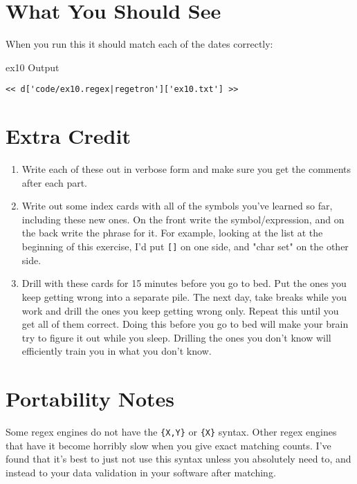 \section{What You Should See}

When you run this it should match each of the dates correctly:

\begin{code}{ex10 Output}
\begin{Verbatim}
<< d['code/ex10.regex|regetron']['ex10.txt'] >>
\end{Verbatim}
\end{code}


\section{Extra Credit}

\begin{enumerate}
\item Write each of these out in verbose form and make sure you get the comments
    after each part.
\item Write out some index cards with all of the symbols you've learned so far,
    including these new ones.  On the front write the symbol/expression, and 
    on the back write the phrase for it.  For example, looking at the list
    at the beginning of this exercise, I'd put \verb|[]| on one side, and "char set"
    on the other side.
\item Drill with these cards for 15 minutes before you go to bed.  Put the ones
    you keep getting wrong into a separate pile.  The next day, 
    take breaks while you work and drill the ones you keep getting wrong only.  Repeat this
    until you get all of them correct.  Doing this before you go to bed
    will make your brain try to figure it out while you sleep.  Drilling the
    ones you don't know will efficiently train you in what you don't know.
\end{enumerate}

\section{Portability Notes}

Some regex engines do not have the \verb|{X,Y}| or \verb|{X}| syntax. Other
regex engines that have it become horribly slow when you give exact matching
counts.  I've found that it's best to just not use this syntax unless you
absolutely need to, and instead to your data validation in your software
after matching.


